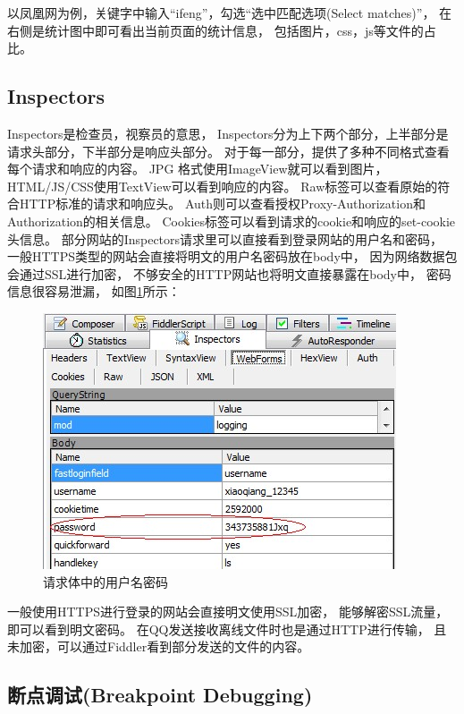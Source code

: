 \documentclass{book}
\begin{document}
以凤凰网为例，关键字中输入“ifeng”，勾选“选中匹配选项(Select matches)”，
在右侧是统计图中即可看出当前页面的统计信息，
包括图片，css，js等文件的占比。

\subsection{Inspectors}

Inspectors是检查员，视察员的意思，
Inspectors分为上下两个部分，上半部分是请求头部分，下半部分是响应头部分。
对于每一部分，提供了多种不同格式查看每个请求和响应的内容。
JPG 格式使用ImageView就可以看到图片，HTML/JS/CSS使用TextView可以看到响应的内容。
Raw标签可以查看原始的符合HTTP标准的请求和响应头。
Auth则可以查看授权Proxy-Authorization和Authorization的相关信息。
Cookies标签可以看到请求的cookie和响应的set-cookie头信息。
部分网站的Inspectors请求里可以直接看到登录网站的用户名和密码，
一般HTTPS类型的网站会直接将明文的用户名密码放在body中，
因为网络数据包会通过SSL进行加密，
不够安全的HTTP网站也将明文直接暴露在body中，
密码信息很容易泄漏，
如图\ref{fig:RequestBodyUserPassword}所示：

\begin{figure}[htbp]
	\centering
	\includegraphics[scale=0.8]{RequestBodyUserPassword.jpg}
	\caption{请求体中的用户名密码}
	\label{fig:RequestBodyUserPassword}
\end{figure}

一般使用HTTPS进行登录的网站会直接明文使用SSL加密，
能够解密SSL流量，即可以看到明文密码。
在QQ发送接收离线文件时也是通过HTTP进行传输，
且未加密，可以通过Fiddler看到部分发送的文件的内容。

\subsection{断点调试(Breakpoint Debugging)}
\end{document}
